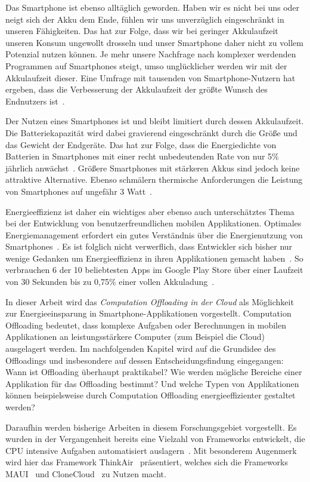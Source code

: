\documentclass{sigchi}
\begin{document}
Das Smartphone ist ebenso alltäglich geworden. Haben wir es nicht bei uns oder neigt sich der Akku dem Ende, fühlen wir uns unverzüglich eingeschränkt in unseren Fähigkeiten.
Das hat zur Folge, dass wir bei geringer Akkulaufzeit unseren Konsum ungewollt drosseln und unser Smartphone daher nicht zu vollem Potenzial nutzen können.
Je mehr unsere Nachfrage nach komplexer werdenden Programmen auf Smartphones steigt, umso unglücklicher werden wir mit der Akkulaufzeit dieser.
Eine Umfrage mit tausenden von Smartphone-Nutzern hat ergeben, dass die Verbesserung der Akkulaufzeit der größte Wunsch des Endnutzers ist~\cite{o13-6}.

Der Nutzen eines Smartphones ist und bleibt limitiert durch dessen Akkulaufzeit.
Die Batteriekapazität wird dabei gravierend eingeschränkt durch die Größe und das Gewicht der Endgeräte.
Das hat zur Folge, dass die Energiedichte von Batterien in Smartphones mit einer recht unbedeutenden Rate von nur 5\% jährlich anwächst~\cite{o12-8}. 
Größere Smartphones mit stärkeren Akkus sind jedoch keine attraktive Alternative.
Ebenso schmälern thermische Anforderungen die Leistung von Smartphones auf ungefähr 3 Watt~\cite{o12-5}.

Energieeffizienz ist daher ein wichtiges aber ebenso auch unterschätztes Thema bei der Entwicklung von benutzerfreundlichen mobilen Applikationen.
Optimales Energiemanagement erfordert ein gutes Verständnis über die Energienutzung von Smartphones~\cite{e1}.
Es ist folglich nicht verwerflich, dass Entwickler sich bisher nur wenige Gedanken um Energieeffizienz in ihren Applikationen gemacht haben~\cite{e3}.
So verbrauchen 6 der 10 beliebtesten Apps im Google Play Store über einer Laufzeit von 30 Sekunden bis zu 0,75\% einer vollen Akkuladung~\cite{e3}.

In dieser Arbeit wird das \emph{Computation Offloading in der Cloud} als Möglichkeit zur Energieeinsparung in Smartphone-Applikationen vorgestellt.
Computation Offloading bedeutet, dass komplexe Aufgaben oder Berechnungen in mobilen Applikationen an leistungsstärkere Computer (zum Beispiel die Cloud) ausgelagert werden.
Im nachfolgenden Kapitel wird auf die Grundidee des Offloadings und insbesondere auf dessen Entscheidungsfindung eingegangen:
Wann ist Offloading überhaupt praktikabel?
Wie werden mögliche Bereiche einer Applikation für das Offloading bestimmt?
Und welche Typen von Applikationen können beispielsweise durch Computation Offloading energieeffizienter gestaltet werden?

Daraufhin werden bisherige Arbeiten in diesem Forschungsgebiet vorgestellt.
Es wurden in der Vergangenheit bereits eine Vielzahl von Frameworks entwickelt, die CPU intensive Aufgaben automatisiert auslagern~\cite{thinkair, maui, clonecloud, cuckoo, moca, smartdiet}.
Mit besonderem Augenmerk wird hier das Framework ThinkAir~\cite{thinkair} präsentiert, welches sich die Frameworks MAUI~\cite{maui} und CloneCloud~\cite{clonecloud} zu Nutzen macht.
\end{document}
